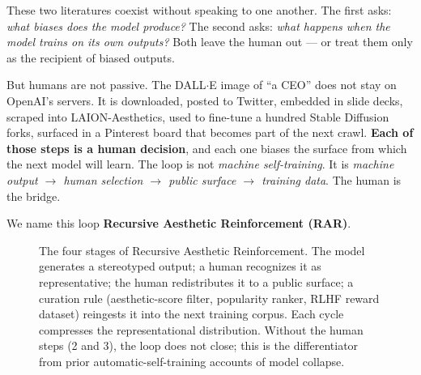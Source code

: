 \documentclass[sigconf,nonacm]{acmart}
\begin{document}
These two literatures coexist without speaking to one another. The first asks: \emph{what biases does the model produce?} The second asks: \emph{what happens when the model trains on its own outputs?} Both leave the human out --- or treat them only as the recipient of biased outputs.

But humans are not passive. The DALL$\cdot$E image of ``a CEO'' does not stay on OpenAI's servers. It is downloaded, posted to Twitter, embedded in slide decks, scraped into LAION-Aesthetics, used to fine-tune a hundred Stable Diffusion forks, surfaced in a Pinterest board that becomes part of the next crawl. \textbf{Each of those steps is a human decision}, and each one biases the surface from which the next model will learn. The loop is not \emph{machine self-training}. It is \emph{machine output \(\rightarrow\) human selection \(\rightarrow\) public surface \(\rightarrow\) training data}. The human is the bridge.

We name this loop \textbf{Recursive Aesthetic Reinforcement (RAR)}.

\begin{figure}[t]
\centering
{}
\caption{The four stages of Recursive Aesthetic Reinforcement. The model generates a stereotyped output; a human recognizes it as representative; the human redistributes it to a public surface; a curation rule (aesthetic-score filter, popularity ranker, RLHF reward dataset) reingests it into the next training corpus. Each cycle compresses the representational distribution. Without the human steps (2 and 3), the loop does not close; this is the differentiator from prior automatic-self-training accounts of model collapse.}
\label{fig:rar-loop}
\end{figure}
\end{document}

